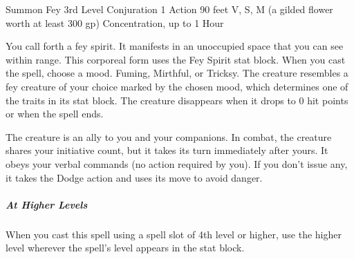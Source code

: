 \documentclass[letterpaper,openany,oneside,twocolumn]{book}
\begin{document}
\DndSpellHeader
  {Summon Fey}
  {3rd Level Conjuration}
  {1 Action}
  {90 feet}
  {V, S, M (a gilded flower worth at least 300 gp)}
  {Concentration, up to 1 Hour}
  
You call forth a fey spirit. It manifests in an unoccupied space that you can see within range. This corporeal form uses the Fey Spirit stat block. When you cast the spell, choose a mood. Fuming, Mirthful, or Tricksy. The creature resembles a fey creature of your choice marked by the chosen mood, which determines one of the traits in its stat block. The creature disappears when it drops to 0 hit points or when the spell ends.

The creature is an ally to you and your companions. In combat, the creature shares your initiative count, but it takes its turn immediately after yours. It obeys your verbal commands (no action required by you). If you don’t issue any, it takes the Dodge action and uses its move to avoid danger.

\subparagraph*{At Higher Levels} When you cast this spell using a spell slot of 4th level or higher, use the higher level wherever the spell's level appears in the stat block.
\end{document}
